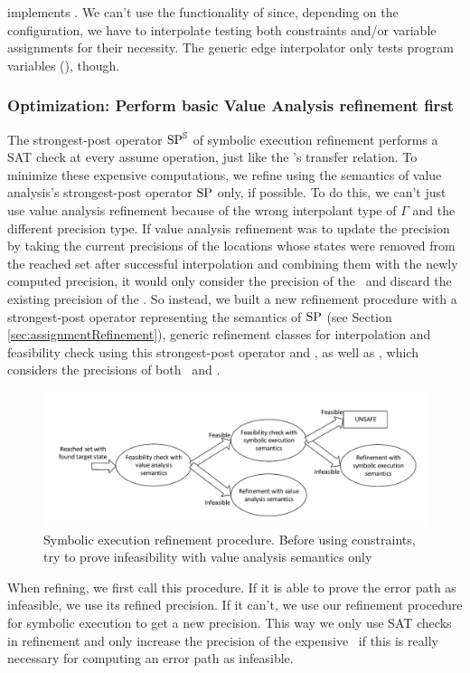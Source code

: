  implements .
We can't use the functionality of  since, depending on the configuration, we have to interpolate
testing both constraints and/or variable assignments for their necessity.
The generic edge interpolator only tests program variables (), though.

\subsubsection{Optimization: Perform basic Value Analysis refinement first}
The strongest-post operator $\text{SP}^{\mathbb{S}}$ of symbolic execution refinement performs a SAT check at every assume operation, just like the \symbolicExecutionCPA's transfer relation.
To minimize these expensive computations, we refine using the semantics of value analysis's strongest-post operator $\text{SP}$ only, if possible.
To do this, we can't just use value analysis refinement because of the wrong interpolant type of $\Gamma$ and the different precision type.
If value analysis refinement was to update the precision by taking the current precisions of the locations whose states were removed from the reached set after successful interpolation and combining them with the newly computed precision, it would only consider the precision of the \ and discard the existing precision of the \constraintsCPA.
So instead, we built a new refinement procedure with a strongest-post operator representing the semantics of $\text{SP}$ (see Section \ref{sec:assignmentRefinement}),  generic refinement classes for interpolation and feasibility check using this strongest-post operator and , as well as , which considers the precisions of both \ and \constraintsCPA.

\begin{figure}[t!]
\includegraphics[width=\linewidth]{implementationCegar/DelegatingRefinementFlow}
\caption{Symbolic execution refinement procedure. Before using constraints, try to prove infeasibility with value analysis semantics only}
\label{fig:delegatingRefFlow}
\end{figure}
When refining, we first call this procedure. If it is able to prove the error path as infeasible, we use its refined precision.
If it can't, we use our refinement procedure for symbolic execution to get a new precision.
This way we only use SAT checks in refinement and only increase the precision of the expensive \constraintsCPA\ if this is really necessary for computing an error path as infeasible.


